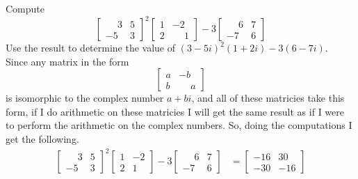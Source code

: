 \documentclass[titlepage]{article}
\newenvironment{problem}[2][Problem]{\begin{trivlist}
\item[\hskip \labelsep {\bfseries #1}\hskip \labelsep {\bfseries #2.}]}{\end{trivlist}}
\begin{document}
 
 
\fancyhf{}
\begin{problem}{1}
Compute
$$
\begin{bmatrix} \phantom{-}3 & 5 \\ -5 & 3\end{bmatrix}^2 
\begin{bmatrix} 1 & -2 \\ 2 & \phantom{-}1 \end{bmatrix} -3\begin{bmatrix}\phantom{-}6 & 7 \\ -7 & 6 \end{bmatrix}
$$
Use the result to determine the value of $(3-5i)^2(1+2i)-3(6-7i)$. \\
Since any matrix in the form
$$ 
\begin{bmatrix}
	 a & -b \\ b & \phantom{-}a
\end{bmatrix}
$$
is isomorphic to the complex number $a+bi$, and all of these matricies take this form, if I do arithmetic on these matricies I will get the same result as if I were to perform the arithmetic on the complex numbers. So, doing the computations I get the following.
\begin{align*}
	\begin{bmatrix}
		\phantom{-}3 & 5 \\ -5 & 3
	\end{bmatrix}^{2}
	\begin{bmatrix}
		1 & -2 \\ 2 & 1
	\end{bmatrix}
	-3 \begin{bmatrix}
		\phantom{-}6 & 7 \\ -7 & 6
	\end{bmatrix}
	&= 
	\begin{bmatrix}
		-16 & 30 \\ -30 & -16

\end{bmatrix}
\end{align*}
\end{problem}
\end{document}

